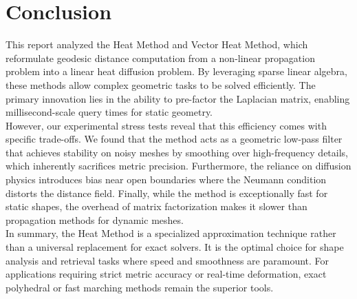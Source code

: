 \documentclass[11pt,a4paper]{article}
\begin{document}
\section{Conclusion}

This report analyzed the Heat Method and Vector Heat Method, which reformulate geodesic distance computation from a non-linear propagation problem into a linear heat diffusion problem. By leveraging sparse linear algebra, these methods allow complex geometric tasks to be solved efficiently. The primary innovation lies in the ability to pre-factor the Laplacian matrix, enabling millisecond-scale query times for static geometry. \\

However, our experimental stress tests reveal that this efficiency comes with specific trade-offs. We found that the method acts as a geometric low-pass filter that achieves stability on noisy meshes by smoothing over high-frequency details, which inherently sacrifices metric precision. Furthermore, the reliance on diffusion physics introduces bias near open boundaries where the Neumann condition distorts the distance field. Finally, while the method is exceptionally fast for static shapes, the overhead of matrix factorization makes it slower than propagation methods for dynamic meshes. \\

In summary, the Heat Method is a specialized approximation technique rather than a universal replacement for exact solvers. It is the optimal choice for shape analysis and retrieval tasks where speed and smoothness are paramount. For applications requiring strict metric accuracy or real-time deformation, exact polyhedral or fast marching methods remain the superior tools.

\end{document}
